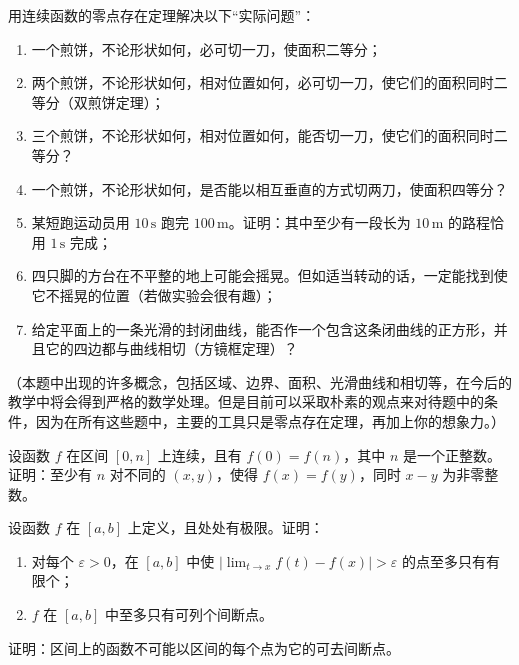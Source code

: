 \begin{xreferenceproblem}[1]
用连续函数的零点存在定理解决以下“实际问题”：
  \begin{enumerate}[label=(\arabic*)]
    \item 一个煎饼，不论形状如何，必可切一刀，使面积二等分；
    \item 两个煎饼，不论形状如何，相对位置如何，必可切一刀，使它们的面积同时二等分（双煎饼定理）；
    \item 三个煎饼，不论形状如何，相对位置如何，能否切一刀，使它们的面积同时二等分？
    \item 一个煎饼，不论形状如何，是否能以相互垂直的方式切两刀，使面积四等分？
    \item 某短跑运动员用 $10\,\mathrm{s}$ 跑完 $100\,\mathrm{m}$。证明：其中至少有一段长为 $10\,\mathrm{m}$ 的路程恰用 $1\,\mathrm{s}$ 完成；
    \item 四只脚的方台在不平整的地上可能会摇晃。但如适当转动的话，一定能找到使它不摇晃的位置（若做实验会很有趣）；
    \item 给定平面上的一条光滑的封闭曲线，能否作一个包含这条闭曲线的正方形，并且它的四边都与曲线相切（方镜框定理）？
  \end{enumerate}

  （本题中出现的许多概念，包括区域、边界、面积、光滑曲线和相切等，在今后的教学中将会得到严格的数学处理。但是目前可以采取朴素的观点来对待题中的条件，因为在所有这些题中，主要的工具只是零点存在定理，再加上你的想象力。）
\end{xreferenceproblem}

\begin{xreferenceproblem}[2]
设函数 $f$ 在区间 $[0,n]$ 上连续，且有 $f(0)=f(n)$，其中 $n$ 是一个正整数。证明：至少有 $n$ 对不同的 $(x,y)$，使得 $f(x)=f(y)$，同时 $x-y$ 为非零整数。
\end{xreferenceproblem}

\begin{xreferenceproblem}[3]
设函数 $f$ 在 $[a,b]$ 上定义，且处处有极限。证明：
  \begin{enumerate}[label=(\arabic*)]
    \item 对每个 $\varepsilon>0$，在 $[a,b]$ 中使 $|\lim_{t\to x}f(t)-f(x)|>\varepsilon$ 的点至多只有有限个；
    \item $f$ 在 $[a,b]$ 中至多只有可列个间断点。
  \end{enumerate}
\end{xreferenceproblem}

\begin{xreferenceproblem}[4]
证明：区间上的函数不可能以区间的每个点为它的可去间断点。
\end{xreferenceproblem}

